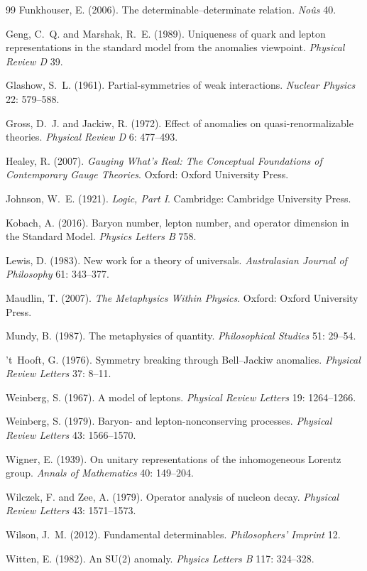 \documentclass{situationist-preprint}
\begin{document}
\begin{thebibliography}{99}
Funkhouser, E. (2006). The determinable--determinate relation. \emph{No\^us} 40.

Geng, C.~Q. and Marshak, R.~E. (1989). Uniqueness of quark and lepton representations in the standard model from the anomalies viewpoint. \emph{Physical Review D} 39.

Glashow, S.~L. (1961). Partial-symmetries of weak interactions. \emph{Nuclear Physics} 22: 579--588.

Gross, D.~J. and Jackiw, R. (1972). Effect of anomalies on quasi-renormalizable theories. \emph{Physical Review D} 6: 477--493.

Healey, R. (2007). \emph{Gauging What's Real: The Conceptual Foundations of Contemporary Gauge Theories}. Oxford: Oxford University Press.

Johnson, W.~E. (1921). \emph{Logic, Part I}. Cambridge: Cambridge University Press.

Kobach, A. (2016). Baryon number, lepton number, and operator dimension in the Standard Model. \emph{Physics Letters B} 758.

Lewis, D. (1983). New work for a theory of universals. \emph{Australasian Journal of Philosophy} 61: 343--377.

Maudlin, T. (2007). \emph{The Metaphysics Within Physics}. Oxford: Oxford University Press.

Mundy, B. (1987). The metaphysics of quantity. \emph{Philosophical Studies} 51: 29--54.

't~Hooft, G. (1976). Symmetry breaking through Bell--Jackiw anomalies. \emph{Physical Review Letters} 37: 8--11.

Weinberg, S. (1967). A model of leptons. \emph{Physical Review Letters} 19: 1264--1266.

Weinberg, S. (1979). Baryon- and lepton-nonconserving processes. \emph{Physical Review Letters} 43: 1566--1570.

Wigner, E. (1939). On unitary representations of the inhomogeneous Lorentz group. \emph{Annals of Mathematics} 40: 149--204.

Wilczek, F. and Zee, A. (1979). Operator analysis of nucleon decay. \emph{Physical Review Letters} 43: 1571--1573.

Wilson, J.~M. (2012). Fundamental determinables. \emph{Philosophers' Imprint} 12.

Witten, E. (1982). An SU(2) anomaly. \emph{Physics Letters B} 117: 324--328.

\end{thebibliography}

\clearpage
\appendix


\end{document}
